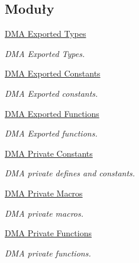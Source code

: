 \subsection*{Moduły}
\begin{DoxyCompactItemize}
\item 
\hyperlink{group___d_m_a___exported___types}{D\+M\+A Exported Types}
\begin{DoxyCompactList}\small\item\em D\+MA Exported Types. \end{DoxyCompactList}\item 
\hyperlink{group___d_m_a___exported___constants}{D\+M\+A Exported Constants}
\begin{DoxyCompactList}\small\item\em D\+MA Exported constants. \end{DoxyCompactList}\item 
\hyperlink{group___d_m_a___exported___functions}{D\+M\+A Exported Functions}
\begin{DoxyCompactList}\small\item\em D\+MA Exported functions. \end{DoxyCompactList}\item 
\hyperlink{group___d_m_a___private___constants}{D\+M\+A Private Constants}
\begin{DoxyCompactList}\small\item\em D\+MA private defines and constants. \end{DoxyCompactList}\item 
\hyperlink{group___d_m_a___private___macros}{D\+M\+A Private Macros}
\begin{DoxyCompactList}\small\item\em D\+MA private macros. \end{DoxyCompactList}\item 
\hyperlink{group___d_m_a___private___functions}{D\+M\+A Private Functions}
\begin{DoxyCompactList}\small\item\em D\+MA private functions. \end{DoxyCompactList}\end{DoxyCompactItemize}
